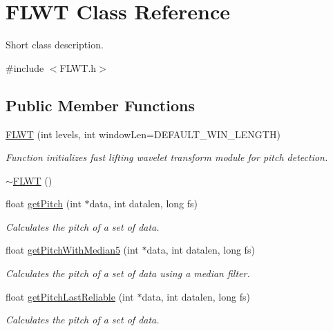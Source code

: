 \hypertarget{class_f_l_w_t}{}\section{F\+L\+W\+T Class Reference}
\label{class_f_l_w_t}


Short class description.  




{\ttfamily \#include $<$F\+L\+W\+T.\+h$>$}

\subsection*{Public Member Functions}
\begin{DoxyCompactItemize}
\item 
\hyperlink{class_f_l_w_t_a265f92a446000bd224d90fe659c33ff2}{F\+L\+W\+T} (int levels, int window\+Len=D\+E\+F\+A\+U\+L\+T\+\_\+\+W\+I\+N\+\_\+\+L\+E\+N\+G\+T\+H)
\begin{DoxyCompactList}\small\item\em Function initializes fast lifting wavelet transform module for pitch detection. \end{DoxyCompactList}\item 
\hyperlink{class_f_l_w_t_aa9b28c200e5faf5196389bccaf94e499}{$\sim$\+F\+L\+W\+T} ()
\item 
float \hyperlink{class_f_l_w_t_a19063b3e713574663ceac2e19ba22559}{get\+Pitch} (int $\ast$data, int datalen, long fs)
\begin{DoxyCompactList}\small\item\em Calculates the pitch of a set of data. \end{DoxyCompactList}\item 
float \hyperlink{class_f_l_w_t_ab7f95afbd68d790c1cf2b5acc22d45ed}{get\+Pitch\+With\+Median5} (int $\ast$data, int datalen, long fs)
\begin{DoxyCompactList}\small\item\em Calculates the pitch of a set of data using a median filter. \end{DoxyCompactList}\item 
float \hyperlink{class_f_l_w_t_ab1116042381c689f1115ddd5267e57e5}{get\+Pitch\+Last\+Reliable} (int $\ast$data, int datalen, long fs)
\begin{DoxyCompactList}\small\item\em Calculates the pitch of a set of data. \end{DoxyCompactList}\item 

\end{DoxyCompactItemize}
